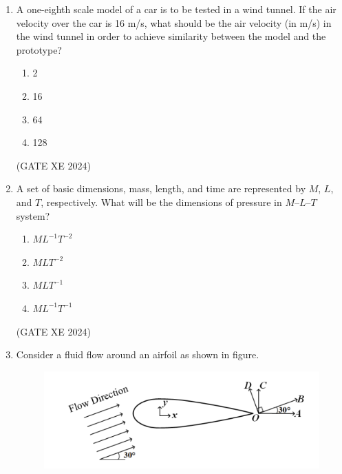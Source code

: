 \documentclass[12pt]{article}
\begin{document}
\begin{enumerate}
The maximum velocity is given by
\begin{enumerate}
\item $\displaystyle \frac{1}{2\mu}\,\rho g h^{2}$
\item $\displaystyle \frac{1}{4\mu}\,\rho g h^{2}$
\item $\displaystyle \frac{1}{\mu}\,\rho g h^{2}$
\item $\displaystyle \frac{1}{8\mu}\,\rho g h^{2}$
\end{enumerate}

(GATE XE 2024)

\item A one-eighth scale model of a car is to be tested in a wind tunnel. If the air velocity
over the car is 16 m/s, what should be the air velocity (in m/s) in the wind tunnel in order
to achieve similarity between the model and the prototype?
\begin{enumerate}
\item 2
\item 16
\item 64
\item 128
\end{enumerate}

(GATE XE 2024)

\item A set of basic dimensions, mass, length, and time are represented by $M$, $L$, and $T$,
respectively. What will be the dimensions of pressure in $M$–$L$–$T$ system?
\begin{enumerate}
\item $M L^{-1} T^{-2}$
\item $M L T^{-2}$
\item $M L T^{-1}$
\item $M L^{-1} T^{-1}$
\end{enumerate}

(GATE XE 2024)

\item Consider a fluid flow around an airfoil as shown in figure. 

\begin{figure}[H]
    \centering
    \includegraphics[width=0.5\columnwidth]{figs/ass5_b_q34.png}
    \caption{}
    \label{fig:placeholder}
\end{figure}


\end{enumerate}
\end{document}
